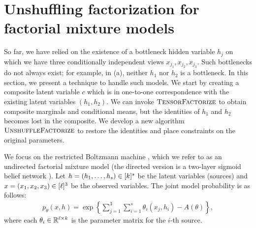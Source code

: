 \section{Unshuffling factorization for factorial mixture models}
\label{sec:factorialModels}

So far, we have relied on the existence of a bottleneck hidden variable $h_j$ on which
we have three conditionally independent views $x_{j_1},x_{j_2},x_{j_3}$.  Such bottlenecks do not always
exist; for example, in (a), neither $h_1$ nor $h_2$ is
a bottleneck.
In this section, we present a technique to handle such models.
We start by creating a composite latent variable $c$ which is in
one-to-one correspondence with the existing latent variables $(h_1,h_2)$.
We can invoke $\text{\sc TensorFactorize}$ to obtain composite marginals and
conditional means, but the identities of $h_1$ and $h_2$ becomes lost in the
composite.  We develop a new algorithm $\text{\sc UnshuffleFactorize}$
to restore the identities and place constraints on the original
parameters.


We focus on the restricted Boltzmann machine
\cite{smolensky86rbm,salakhutdinov09softmax},
which we refer to as an undirected factorial mixture model
(the directed version is a two-layer sigmoid belief network \cite{saul96sigmoid}).
Let $h = (h_1, \dots, h_s) \in [k]^s$ be the latent variables (sources)
and $x = (x_1, x_2, x_3) \in [\ell]^3$ be the observed variables.
The joint model probability is as follows:
\begin{align}
p_\theta(x, h) = \exp \left\{ \sum_{j=1}^3 \sum_{i=1}^s \theta_i(x_j, h_i) - A(\theta) \right\},
\end{align}
where each $\theta_i \in \mathbb{R}^{\ell \times k}$ is the parameter matrix for the $i$-th source.

